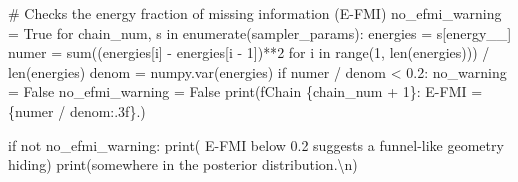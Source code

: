\documentclass[
  letterpaper,
  DIV=11,
  numbers=noendperiod]{scrartcl}
\newenvironment{Shaded}{\begin{snugshade}}{\end{snugshade}}
\newcommand{\BuiltInTok}[1]{\textcolor[rgb]{0.00,0.23,0.31}{#1}}
\newcommand{\CharTok}[1]{\textcolor[rgb]{0.13,0.47,0.30}{#1}}
\newcommand{\CommentTok}[1]{\textcolor[rgb]{0.37,0.37,0.37}{#1}}
\newcommand{\ControlFlowTok}[1]{\textcolor[rgb]{0.00,0.23,0.31}{#1}}
\newcommand{\DecValTok}[1]{\textcolor[rgb]{0.68,0.00,0.00}{#1}}
\newcommand{\FloatTok}[1]{\textcolor[rgb]{0.68,0.00,0.00}{#1}}
\newcommand{\KeywordTok}[1]{\textcolor[rgb]{0.00,0.23,0.31}{#1}}
\newcommand{\NormalTok}[1]{\textcolor[rgb]{0.00,0.23,0.31}{#1}}
\newcommand{\OperatorTok}[1]{\textcolor[rgb]{0.37,0.37,0.37}{#1}}
\newcommand{\SpecialCharTok}[1]{\textcolor[rgb]{0.37,0.37,0.37}{#1}}
\newcommand{\SpecialStringTok}[1]{\textcolor[rgb]{0.13,0.47,0.30}{#1}}
\newcommand{\StringTok}[1]{\textcolor[rgb]{0.13,0.47,0.30}{#1}}
\newcommand{\VariableTok}[1]{\textcolor[rgb]{0.07,0.07,0.07}{#1}}
\begin{document}
\begin{Shaded}
\begin{Highlighting}[]
  \CommentTok{\# Checks the energy fraction of missing information (E{-}FMI)}
\NormalTok{  no\_efmi\_warning }\OperatorTok{=} \VariableTok{True}
  \ControlFlowTok{for}\NormalTok{ chain\_num, s }\KeywordTok{in} \BuiltInTok{enumerate}\NormalTok{(sampler\_params):}
\NormalTok{    energies }\OperatorTok{=}\NormalTok{ s[}\StringTok{\textquotesingle{}energy\_\_\textquotesingle{}}\NormalTok{]}
\NormalTok{    numer }\OperatorTok{=} \BuiltInTok{sum}\NormalTok{((energies[i] }\OperatorTok{{-}}\NormalTok{ energies[i }\OperatorTok{{-}} \DecValTok{1}\NormalTok{])}\OperatorTok{**}\DecValTok{2} \ControlFlowTok{for}\NormalTok{ i }\KeywordTok{in} \BuiltInTok{range}\NormalTok{(}\DecValTok{1}\NormalTok{, }\BuiltInTok{len}\NormalTok{(energies))) }\OperatorTok{/} \BuiltInTok{len}\NormalTok{(energies)}
\NormalTok{    denom }\OperatorTok{=}\NormalTok{ numpy.var(energies)}
    \ControlFlowTok{if}\NormalTok{ numer }\OperatorTok{/}\NormalTok{ denom }\OperatorTok{\textless{}} \FloatTok{0.2}\NormalTok{:}
\NormalTok{      no\_warning }\OperatorTok{=} \VariableTok{False}
\NormalTok{      no\_efmi\_warning }\OperatorTok{=} \VariableTok{False}
      \BuiltInTok{print}\NormalTok{(}\SpecialStringTok{f\textquotesingle{}Chain }\SpecialCharTok{\{}\NormalTok{chain\_num }\OperatorTok{+} \DecValTok{1}\SpecialCharTok{\}}\SpecialStringTok{: E{-}FMI = }\SpecialCharTok{\{}\NormalTok{numer }\OperatorTok{/}\NormalTok{ denom}\SpecialCharTok{:.3f\}}\SpecialStringTok{.\textquotesingle{}}\NormalTok{)}
   
  \ControlFlowTok{if} \KeywordTok{not}\NormalTok{ no\_efmi\_warning:}
    \BuiltInTok{print}\NormalTok{(}\StringTok{\textquotesingle{}  E{-}FMI below 0.2 suggests a funnel{-}like geometry hiding\textquotesingle{}}\NormalTok{)}
    \BuiltInTok{print}\NormalTok{(}\StringTok{\textquotesingle{}somewhere in the posterior distribution.}\CharTok{\textbackslash{}n}\StringTok{\textquotesingle{}}\NormalTok{)}
  

\end{Highlighting}
\end{Shaded}
\end{document}
